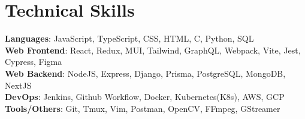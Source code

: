 \documentclass[letterpaper,11pt]{article}
\begin{document}
\section{Technical Skills}
 \begin{itemize}[leftmargin=0.15in, label={}]
    \small{\item{
      \textbf{Languages}{: JavaScript, TypeScript, CSS, HTML, C, Python, SQL} \\
      \textbf{Web Frontend}{: React, Redux, MUI, Tailwind, GraphQL, Webpack, Vite, Jest, Cypress, Figma} \\
      \textbf{Web Backend}{: NodeJS, Express, Django, Prisma, PostgreSQL, MongoDB, NextJS}\\
      \textbf{DevOps}{: Jenkins, Github Workflow, Docker, Kubernetes(K8s), AWS, GCP} \\
      \textbf{Tools/Others}{: Git, Tmux, Vim, Postman, OpenCV, FFmpeg, GStreamer} \\
     }}
 \end{itemize}


\end{document}
